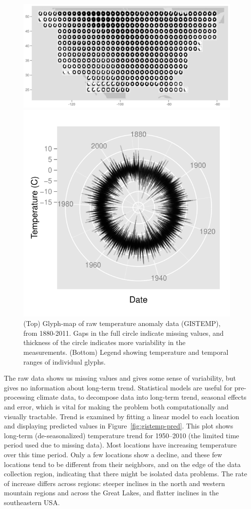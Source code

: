 \documentclass[oneside]{article}
\begin{document}
\begin{figure}[htbp]
  \centering

  \includegraphics[width=1\linewidth]{gistemp-polar-raw}

  \includegraphics[width=0.33\linewidth]{gistemp-polar-legend}

  \caption{(Top) Glyph-map of raw temperature anomaly data (GISTEMP), from 1880-2011. Gaps in the full circle indicate missing values, and thickness of the circle indicates more variability in the measurements.  (Bottom) Legend showing temperature and temporal ranges of individual glyphs.}
  \label{fig:gistemp-raw}
\end{figure}

The raw data shows us missing values and gives some sense of variability, but gives no information about long-term trend. Statistical models are useful for pre-processing climate data, to decompose data into long-term trend, seasonal effects and error, which is vital for making the problem both computationally and visually tractable. Trend is examined by fitting a linear model to each location and displaying predicted values in Figure~\ref{fig:gistemp-pred}. This plot shows long-term (de-seasonalized) temperature trend for 1950--2010 (the limited time period used due to missing data). Most locations have increasing temperature over this time period. Only a few locations show a decline, and these few locations tend to be different from their neighbors, and on the edge of the data collection region, indicating that there might be isolated data problems. The rate of increase differs across regions: steeper inclines in the north and western mountain regions and across the Great Lakes, and flatter inclines in the southeastern USA.
\end{document}
